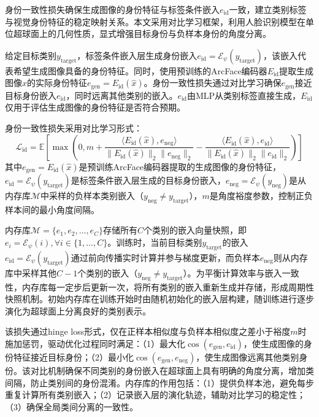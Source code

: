身份一致性损失确保生成图像的身份特征与标签条件嵌入$e_{\text{id}}$一致，建立类别标签与视觉身份特征的稳定映射关系。本文采用对比学习框架，利用人脸识别模型在单位超球面上的几何性质，显式增强目标身份与负样本身份的角度分离。

给定目标类别$y_{\text{target}}$，标签条件嵌入层生成身份嵌入$e_{\text{id}} = \mathcal{E}_\psi(y_{\text{target}})$，该嵌入代表希望生成图像具备的身份特征。同时，使用预训练的ArcFace编码器$E_{\text{id}}$提取生成图像$\hat{x}$的实际身份特征$e_{\text{gen}} = E_{\text{id}}(\hat{x})$。身份一致性损失通过对比学习确保$e_{\text{gen}}$接近目标身份嵌入$e_{\text{id}}$，同时远离其他类别的嵌入。$e_{\text{id}}$由MLP从类别标签直接生成，$E_{\text{id}}$仅用于评估生成图像的身份特征是否符合预期。

身份一致性损失采用对比学习形式：
\begin{equation}\label{eq:mia_identity_loss}
    \mathcal{L}_{\text{id}} = \mathbb{E}\left[\max\left(0, m + \frac{\langle E_{\text{id}}(\hat{x}), e_{\text{neg}} \rangle}{\|E_{\text{id}}(\hat{x})\|_2 \|e_{\text{neg}}\|_2} - \frac{\langle E_{\text{id}}(\hat{x}), e_{\text{id}} \rangle}{\|E_{\text{id}}(\hat{x})\|_2 \|e_{\text{id}}\|_2}\right)\right]
\end{equation}
其中$e_{\text{gen}} = E_{\text{id}}(\hat{x})$是预训练ArcFace编码器提取的生成图像的身份特征，$e_{\text{id}} = \mathcal{E}_\psi(y_{\text{target}})$是标签条件嵌入层生成的目标身份嵌入，$e_{\text{neg}} = \mathcal{E}_\psi(y_{\text{neg}})$是从内存库$\mathcal{M}$中采样的负样本类别嵌入（$y_{\text{neg}} \neq y_{\text{target}}$），$m$是角度裕度参数，控制正负样本间的最小角度间隔。

内存库$\mathcal{M}=\{e_1, e_2, \ldots, e_C\}$存储所有$C$个类别的嵌入向量快照，即$e_i = \mathcal{E}_\psi(i), \forall i \in \{1,\ldots,C\}$。训练时，当前目标类别$y_{\text{target}}$的嵌入$e_{\text{id}} = \mathcal{E}_\psi(y_{\text{target}})$通过前向传播实时计算并参与梯度更新，而负样本$e_{\text{neg}}$则从内存库中采样其他$C-1$个类别的嵌入（$y_{\text{neg}} \neq y_{\text{target}}$）。为平衡计算效率与嵌入一致性，内存库每一定步后更新一次，将所有类别的嵌入重新生成并存储，形成周期性快照机制。初始内存库在训练开始时由随机初始化的嵌入层构建，随训练进行逐步演化为超球面上分离良好的类别表示。

该损失通过hinge loss形式，仅在正样本相似度与负样本相似度之差小于裕度$m$时施加惩罚，驱动优化过程同时满足：（1）最大化$\cos(e_{\text{gen}}, e_{\text{id}})$，使生成图像的身份特征接近目标身份；（2）最小化$\cos(e_{\text{gen}}, e_{\text{neg}})$，使生成图像远离其他类别身份。该对比机制确保不同类别的身份嵌入在超球面上具有明确的角度分离，增加类间隔，防止类别间的身份混淆。内存库的作用包括：（1）提供负样本池，避免每步重复计算所有类别嵌入；（2）记录嵌入层的演化轨迹，辅助对比学习的稳定性；（3）确保全局类间分离的一致性。

